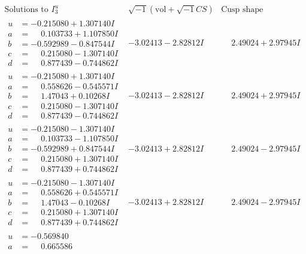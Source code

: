 \documentclass[1p]{elsarticle_modified}
\theoremstyle{definition}
\newcommand{\I}{\sqrt{-1}}
\begin{document}
$$\begin{array}{c|c|c}  
\text{Solutions to }I^u_{3}& \I (\text{vol} + \sqrt{-1}CS) & \text{Cusp shape}\\
 \hline 
\begin{aligned}
u &= -0.215080 + 1.307140 I \\
a &= \phantom{-}0.103733 + 1.107850 I \\
b &= -0.592989 - 0.847544 I \\
c &= \phantom{-}0.215080 - 1.307140 I \\
d &= \phantom{-}0.877439 - 0.744862 I\end{aligned}
 & -3.02413 - 2.82812 I & \phantom{-}2.49024 + 2.97945 I \\ \hline\begin{aligned}
u &= -0.215080 + 1.307140 I \\
a &= \phantom{-}0.558626 - 0.545571 I \\
b &= \phantom{-}1.47043 + 0.10268 I \\
c &= \phantom{-}0.215080 - 1.307140 I \\
d &= \phantom{-}0.877439 - 0.744862 I\end{aligned}
 & -3.02413 - 2.82812 I & \phantom{-}2.49024 + 2.97945 I \\ \hline\begin{aligned}
u &= -0.215080 - 1.307140 I \\
a &= \phantom{-}0.103733 - 1.107850 I \\
b &= -0.592989 + 0.847544 I \\
c &= \phantom{-}0.215080 + 1.307140 I \\
d &= \phantom{-}0.877439 + 0.744862 I\end{aligned}
 & -3.02413 + 2.82812 I & \phantom{-}2.49024 - 2.97945 I \\ \hline\begin{aligned}
u &= -0.215080 - 1.307140 I \\
a &= \phantom{-}0.558626 + 0.545571 I \\
b &= \phantom{-}1.47043 - 0.10268 I \\
c &= \phantom{-}0.215080 + 1.307140 I \\
d &= \phantom{-}0.877439 + 0.744862 I\end{aligned}
 & -3.02413 + 2.82812 I & \phantom{-}2.49024 - 2.97945 I \\ \hline\begin{aligned}
u &= -0.569840\phantom{ +0.000000I} \\
a &= \phantom{-}0.665586\phantom{ +0.000000I} \\

\end{aligned}
\end{array}$$
\end{document}
